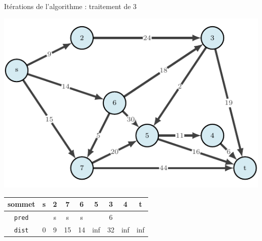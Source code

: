 \begin{frame}{Itérations de l'algorithme : traitement de $3$}
    \begin{center}
        \includegraphics[height=.6\textheight]{fig/ordinal-0.pdf}      
    \begin{tabular}{c|cccccccc}
        
        sommet & s       &2      &7      &6      &5      &3      &4      &t      \\
        \hline
        \texttt{pred} & &s      &s      &s      &       &6      &       &       \\
        \texttt{dist} & 0       &9      &15     &14     &inf    &32     &inf    &inf    \\
    \end{tabular}
\end{center}
\end{frame}

